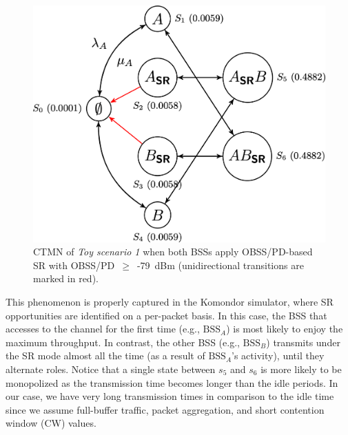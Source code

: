 \documentclass{ieeeaccess}
\begin{document}
\begin{figure}[ht!]
	\centering    
	\includegraphics[width=.9\columnwidth]{ctmn_toy_scenario_1c}
	\caption{CTMN of \emph{Toy scenario 1} when both BSSs apply OBSS/PD-based SR with OBSS/PD~$\geq$~-79~dBm (unidirectional transitions are marked in red).}
	\label{fig:ctmn_toy_scenario_1c}
\end{figure}

This phenomenon is properly captured in the Komondor simulator, where SR opportunities are identified on a per-packet basis. In this case, the BSS that accesses to the channel for the first time (e.g., $\text{BSS}_A$) is most likely to enjoy the maximum throughput. In contrast, the other BSS (e.g., $\text{BSS}_B$) transmits under the SR mode almost all the time (as a result of $\text{BSS}_A$'s activity), until they alternate roles. Notice that a single state between $s_5$  and $s_6$ is more likely to be monopolized as the transmission time becomes longer than the idle periods. In our case, we have very long transmission times in comparison to the idle time since we assume full-buffer traffic, packet aggregation, and short contention window (CW) values.

\end{document}
